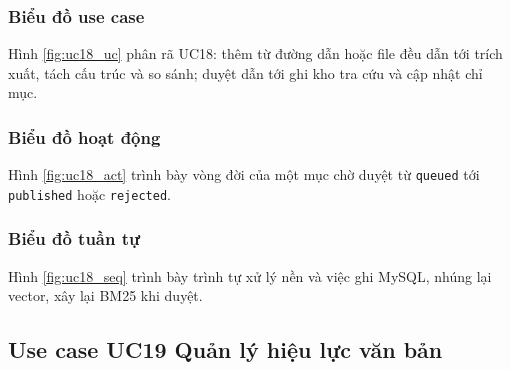 \documentclass[../DoAn.tex]{subfiles}
\begin{document}
\subsubsection{Biểu đồ use case}
Hình \ref{fig:uc18_uc} phân rã UC18: thêm từ đường dẫn hoặc file đều dẫn tới trích xuất, tách cấu trúc và so sánh; duyệt dẫn tới ghi kho tra cứu và cập nhật chỉ mục.


\subsubsection{Biểu đồ hoạt động}
Hình \ref{fig:uc18_act} trình bày vòng đời của một mục chờ duyệt từ \texttt{queued} tới \texttt{published} hoặc \texttt{rejected}.


\subsubsection{Biểu đồ tuần tự}
Hình \ref{fig:uc18_seq} trình bày trình tự xử lý nền và việc ghi MySQL, nhúng lại vector, xây lại BM25 khi duyệt.



\subsection{Use case UC19 Quản lý hiệu lực văn bản}
\label{subsection:uc19}
\end{document}
